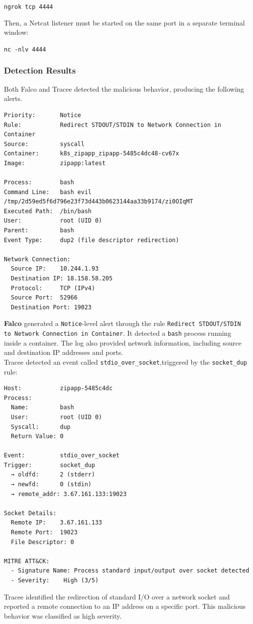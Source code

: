 \texttt{ngrok tcp 4444}

\noindent Then, a Netcat listener must be started on the same port in a separate terminal window:

\texttt{nc -nlv 4444}


\subsubsection{Detection Results}
Both Falco and Tracee detected the malicious behavior, producing the following alerts.
\begin{verbatim}
Priority:       Notice
Rule:           Redirect STDOUT/STDIN to Network Connection in Container
Source:         syscall
Container:      k8s_zipapp_zipapp-5485c4dc48-cv67x
Image:          zipapp:latest

Process:        bash         
Command Line:   bash evil /tmp/2d59ed5f6d796e23f73d443b0623144aa33b9174/zi0OIqMT
Executed Path:  /bin/bash
User:           root (UID 0)
Parent:         bash
Event Type:     dup2 (file descriptor redirection)

Network Connection:
  Source IP:    10.244.1.93
  Destination IP: 18.158.58.205
  Protocol:     TCP (IPv4)
  Source Port:  52966
  Destination Port: 19023
\end{verbatim}
\textbf{Falco} generated a \texttt{Notice}-level alert through the rule \texttt{Redirect STDOUT/STDIN to Network Connection in Container}. It detected a \texttt{bash} process running inside a container. The log also provided network information, including source and destination IP addresses and ports.\\
Tracee detected an event called \texttt{stdio\_over\_socket},triggered by the \texttt{socket\_dup} rule:
\begin{verbatim}
Host:           zipapp-5485c4dc
Process:
  Name:         bash
  User:         root (UID 0)
  Syscall:      dup
  Return Value: 0

Event:          stdio_over_socket
Trigger:        socket_dup
  → oldfd:      2 (stderr)
  → newfd:      0 (stdin)
  → remote_addr: 3.67.161.133:19023

Socket Details:
  Remote IP:    3.67.161.133
  Remote Port:  19023
  File Descriptor: 0

MITRE ATT&CK:
  - Signature Name: Process standard input/output over socket detected
  - Severity:    High (3/5)
\end{verbatim}
Tracee identified the redirection of standard I/O over a network socket and reported a remote connection to an IP address on a specific port. This malicious behavior was classified as high severity.


